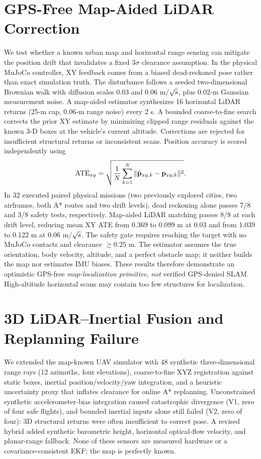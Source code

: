 \documentclass[conference]{IEEEtran}
\begin{document}
\section{GPS-Free Map-Aided LiDAR Correction}
We test whether a known urban map and horizontal range sensing can mitigate the position drift that invalidates a fixed $3\sigma$ clearance assumption. In the physical MuJoCo controller, XY feedback comes from a biased dead-reckoned pose rather than exact simulation truth. The disturbance follows a seeded two-dimensional Brownian walk with diffusion scales $0.03$ and $0.06$ m/$\sqrt{\rm s}$, plus 0.02-m Gaussian measurement noise. A map-aided estimator synthesizes 16 horizontal LiDAR returns (25-m cap, 0.06-m range noise) every 2 s. A bounded coarse-to-fine search corrects the prior XY estimate by minimizing clipped range residuals against the known 3-D boxes at the vehicle's current altitude. Corrections are rejected for insufficient structural returns or inconsistent scans. Position accuracy is scored independently using
\begin{equation}
{\rm ATE}_{xy}=\sqrt{\frac{1}{N}\sum_{k=1}^{N}
\|\hat{\mathbf p}_{xy,k}-\mathbf p_{xy,k}\|^2}.
\end{equation}
In 32 executed paired physical missions (two previously explored cities, two airframes, both A* routes and two drift levels), dead reckoning alone passes 7/8 and 3/8 safety tests, respectively. Map-aided LiDAR matching passes 8/8 at each drift level, reducing mean XY ATE from 0.369 to 0.099 m at $0.03$ and from 1.039 to 0.122 m at $0.06$ m/$\sqrt{\rm s}$. The safety gate requires reaching the target with no MuJoCo contacts and clearance $\geq0.25$ m. The estimator assumes the true orientation, body velocity, altitude, and a perfect obstacle map; it neither builds the map nor estimates IMU biases. These results therefore demonstrate an optimistic GPS-free \emph{map-localization primitive}, \emph{not} verified GPS-denied SLAM. High-altitude horizontal scans may contain too few structures for localization.

\section{3D LiDAR--Inertial Fusion and Replanning Failure}
We extended the map-known UAV simulator with 48 synthetic three-dimensional range rays (12 azimuths, four elevations), coarse-to-fine XYZ registration against static boxes, inertial position/velocity/yaw integration, and a heuristic uncertainty proxy that inflates clearance for online A* replanning. Unconstrained synthetic accelerometer-bias integration caused catastrophic divergence (V1, zero of four safe flights), and bounded inertial inputs alone still failed (V2, zero of four): 3D structural returns were often insufficient to correct pose. A revised hybrid added synthetic barometric height, horizontal optical-flow velocity, and planar-range fallback. None of these sensors are measured hardware or a covariance-consistent EKF; the map is perfectly known.
\end{document}

